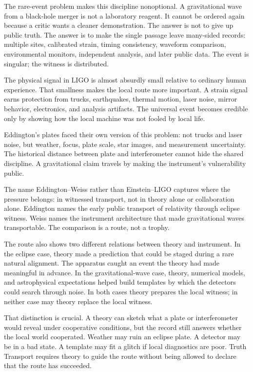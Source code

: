 The rare-event problem makes this discipline nonoptional. A gravitational
wave from a black-hole merger is not a laboratory reagent. It cannot be
ordered again because a critic wants a cleaner demonstration. The answer
is not to give up public truth. The answer is to make the single passage
leave many-sided records: multiple sites, calibrated strain, timing
consistency, waveform comparison, environmental monitors, independent
analysis, and later public data. The event is singular; the witness is
distributed.

The physical signal in LIGO is almost absurdly small relative to ordinary
human experience. That smallness makes the local route more important. A
strain signal earns protection from trucks, earthquakes, thermal motion,
laser noise, mirror behavior, electronics, and analysis artifacts. The
universal event becomes credible only by showing how the local machine
was not fooled by local life.

Eddington's plates faced their own version of this problem: not trucks
and laser noise, but weather, focus, plate scale, star images, and
measurement uncertainty. The historical distance between plate and
interferometer cannot hide the shared discipline. A gravitational claim
travels by making the instrument's vulnerability public.

The name Eddington--Weiss rather than Einstein--LIGO captures where the
pressure belongs: in witnessed transport, not in theory alone or
collaboration alone. Eddington names the early public transport of
relativity through eclipse witness. Weiss names the instrument
architecture that made gravitational waves transportable. The comparison
is a route, not a trophy.

The route also shows two different relations between theory and
instrument. In the eclipse case, theory made a prediction that could be
staged during a rare natural alignment. The apparatus caught an event
the theory had made meaningful in advance. In the gravitational-wave
case, theory, numerical models, and astrophysical expectations helped
build templates by which the detectors could search through noise. In
both cases theory prepares the local witness; in neither case may theory
replace the local witness.

That distinction is crucial. A theory can sketch what a plate or
interferometer would reveal under cooperative conditions, but the record
still answers whether the local world cooperated. Weather may ruin an
eclipse plate. A detector may be in a bad state. A template may fit a
glitch if local diagnostics are poor. Truth Transport requires theory to
guide the route without being allowed to declare that the route has
succeeded.

